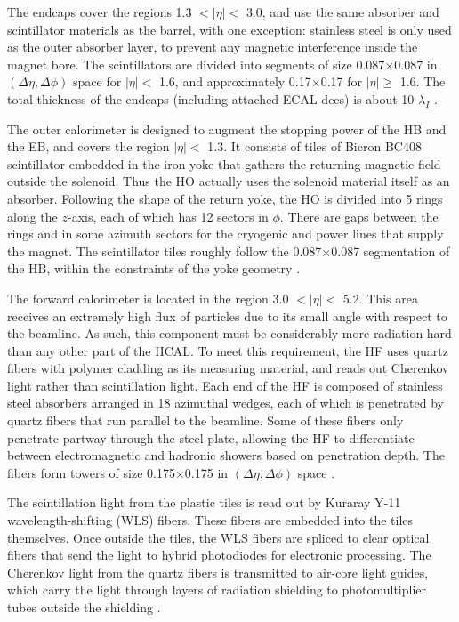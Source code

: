 The endcaps cover the regions 1.3 $< |\eta| <$ 3.0, and use the same
absorber and scintillator materials as the barrel, with one exception:
stainless steel is only used as the outer absorber layer, to
prevent any magnetic interference inside the magnet bore. The
scintillators are divided into segments of size 0.087$\times$0.087 in
$(\Delta\eta,\Delta\phi)$ space for $|\eta| <$ 1.6, and approximately
0.17$\times$0.17 for $|\eta| \geq$ 1.6. The total thickness of the
endcaps (including attached ECAL dees) is about 10 $\lambda_I$
\cite{accelexper}.

The outer calorimeter is designed to augment the stopping power of the
HB and the EB, and covers the region $|\eta| <$ 1.3. It consists of
tiles of Bicron BC408 scintillator embedded in the iron yoke that
gathers the returning magnetic field outside the solenoid. Thus the HO
actually uses the solenoid material itself as an absorber.
Following the shape of the return yoke, the HO is divided into 5 rings
along the $z$-axis, each of which has 12 sectors in $\phi$. There are
gaps between the rings and in some azimuth sectors for the cryogenic
and power lines that supply the magnet. The scintillator tiles roughly
follow the 0.087$\times$0.087 segmentation of the HB, within the
constraints of the yoke geometry \cite{accelexper}.

The forward calorimeter is located in the region 3.0 $< |\eta| <$
5.2. This area receives an extremely high flux of particles due to its
small angle with respect to the beamline. As such, this component
must be considerably more radiation hard than any other part of the
HCAL. To meet this requirement, the HF uses quartz fibers with polymer
cladding as its measuring material, and reads out Cherenkov light rather than
scintillation light. Each end of the HF is composed of stainless steel
absorbers arranged in 18 azimuthal wedges, each of which is penetrated
by quartz fibers that run parallel to the beamline. Some of these
fibers only penetrate partway through the steel plate, allowing the HF to
differentiate between electromagnetic and hadronic showers based on
penetration depth. The fibers form towers of size 0.175$\times$0.175
in $(\Delta\eta,\Delta\phi)$ space \cite{accelexper}.

The scintillation light from the plastic tiles is read out by
Kuraray Y-11 wavelength-shifting (WLS) fibers. These fibers are embedded
into the tiles themselves. Once outside the tiles, the WLS fibers are
spliced to clear optical fibers that send the light to hybrid
photodiodes for electronic processing. The Cherenkov light from the
quartz fibers is transmitted to air-core light guides, which carry the
light through layers of radiation shielding to photomultiplier tubes
outside the shielding \cite{accelexper}.

